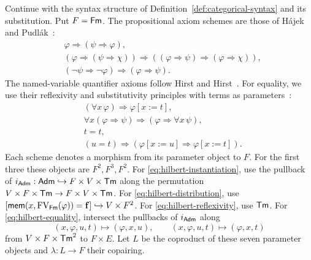 Continue with the syntax structure of
Definition~\ref{def:categorical-syntax} and its substitution.
Put $F=\mathsf{Fm}$. The propositional axiom schemes are those of
H\'ajek and Pudl\'ak~\cite[0.10, p.~7]{HP}:
\begin{align}
 &\varphi\Rightarrow(\psi\Rightarrow\varphi),
                                                        \label{eq:hilbert-one}\\
 &(\varphi\Rightarrow(\psi\Rightarrow\chi))
   \Rightarrow((\varphi\Rightarrow\psi)
   \Rightarrow(\varphi\Rightarrow\chi)),
                                                        \label{eq:hilbert-two}\\
 &(\neg\psi\Rightarrow\neg\varphi)
   \Rightarrow(\varphi\Rightarrow\psi).
                                                        \label{eq:hilbert-three}
\end{align}
The named-variable quantifier axioms follow
Hirst and Hirst~\cite[Sections 2.11--2.12]{HH}. For equality, we use
their reflexivity and substitutivity principles with terms as
parameters~\cite[Section 3.1]{HH}:
\begin{align}
 &(\forall x\,\varphi)\Rightarrow\varphi[x:=t],
                                                        \label{eq:hilbert-instantiation}\\
 &\forall x(\varphi\Rightarrow\psi)
       \Rightarrow(\varphi\Rightarrow\forall x\,\psi),
                                                        \label{eq:hilbert-distribution}\\
 &t=t,                                                   \label{eq:hilbert-reflexivity}\\
 &(u=t)\Rightarrow
       (\varphi[x:=u]\Rightarrow\varphi[x:=t]).           \label{eq:hilbert-equality}
\end{align}
Each scheme denotes a morphism from its parameter object to $F$.
For the first three these objects are $F^2,F^3,F^2$.
For \eqref{eq:hilbert-instantiation}, use the pullback of
$i_{\mathsf{Adm}}:\mathsf{Adm}\hookrightarrow F\times V\times\mathsf{Tm}$ along the
permutation $V\times F\times\mathsf{Tm}\to F\times V\times\mathsf{Tm}$.
For \eqref{eq:hilbert-distribution}, use
$[\mathsf{mem}(x,\operatorname{FV}_{\mathsf{Fm}}(\varphi))=\mathbf{f}]
\hookrightarrow V\times F^2$.
For \eqref{eq:hilbert-reflexivity}, use $\mathsf{Tm}$.
For \eqref{eq:hilbert-equality}, intersect the pullbacks of $i_{\mathsf{Adm}}$
along
\[
 (x,\varphi,u,t)\longmapsto(\varphi,x,u),\qquad
 (x,\varphi,u,t)\longmapsto(\varphi,x,t)
\]
from $V\times F\times\mathsf{Tm}^2$ to $F\times E$.
Let $L$ be the coproduct of these seven parameter objects and
$\lambda:L\to F$ their copairing.

